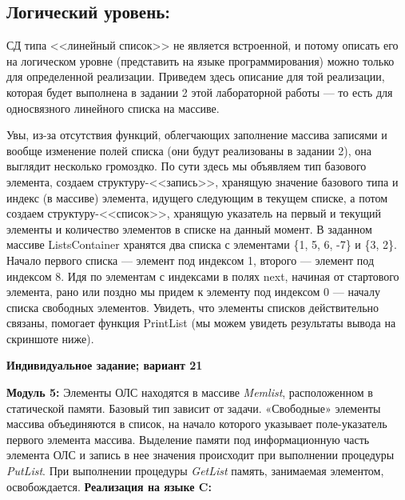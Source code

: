 \documentclass[12pt]{article}
\begin{document}
{	\subsection{Логический уровень:}
	\label{task_1_3}
	СД типа <<линейный список>> не является встроенной, и потому описать его на логическом уровне (представить на языке программирования) можно только для определенной реализации. Приведем здесь описание для той реализации, которая будет выполнена в задании 2 этой лабораторной работы --- то есть для односвязного линейного списка на массиве.
	
	 
	
	Увы, из-за отсутствия функций, облегчающих заполнение массива записями и вообще изменение полей списка (они будут реализованы в задании 2), она выглядит несколько громоздко. По сути здесь мы объявляем тип базового элемента, создаем структуру-<<запись>>, хранящую значение базового типа и индекс (в массиве) элемента, идущего следующим в текущем списке, а потом создаем структуру-<<список>>, хранящую указатель на первый и текущий элементы и количество элементов в списке на данный момент. В заданном массиве ListsContainer хранятся два списка с элементами \{1, 5, 6, -7\} и \{3, 2\}. Начало первого списка --- элемент под индексом 1, второго --- элемент под индексом 8. Идя по элементам с индексами в полях next, начиная от стартового элемента, рано или поздно мы придем к элементу под индексом 0 --- началу списка свободных элементов. Увидеть, что элементы списков действительно связаны, помогает функция PrintList (мы можем увидеть результаты вывода на скриншоте ниже).
	
	\begin{figure}[bh]
		\noindent{}
	\end{figure}
	
	\newpage
	
	\begin{center}
	{\bf Индивидуальное задание; вариант 21}
	\end{center}
	{\bf Модуль 5:} Элементы ОЛС находятся в массиве {\it Memlist}, расположенном в статической памяти. Базовый тип зависит от задачи. «Свободные» элементы массива объединяются в список, на начало которого указывает поле-указатель первого элемента массива. Выделение памяти под информационную часть элемента  ОЛС и запись в нее значения происходит при выполнении процедуры {\it PutList}. При выполнении процедуры {\it GetList} память, занимаемая  элементом, освобождается.
	{\bf Реализация на языке C:}
	
}
\end{document}
